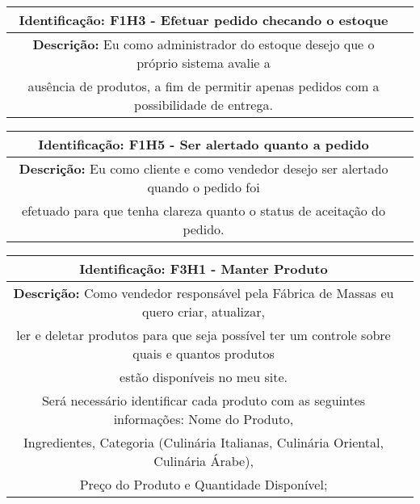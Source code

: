     \begin{table}[H]
    \centering
    \begin{tabular}{c|p{10cm}}
    \hline
    \textbf{Identificação:} F1H3 - Efetuar pedido checando o estoque \\
    \hline
    \textbf{Descrição:} Eu como administrador do estoque desejo que o próprio sistema avalie a \\
    ausência de produtos, a fim de permitir apenas pedidos com a possibilidade de entrega. \\
    \hline
    \end{tabular}
    \end{table}

    \begin{table}[H]
    \centering
    \begin{tabular}{c|p{10cm}}
    \hline
    \textbf{Identificação:} F1H5 - Ser alertado quanto a pedido \\
    \hline
    \textbf{Descrição:} Eu como cliente e como vendedor desejo ser alertado quando o pedido foi \\
    efetuado para que tenha clareza quanto o status de aceitação do pedido.\\
    \hline
    \end{tabular}
\end{table}

\begin{table}[H]
    \centering
    \begin{tabular}{c|p{10cm}}
    \hline
    \textbf{Identificação:} F3H1 - Manter Produto \\
    \hline
    \textbf{Descrição:} Como vendedor responsável pela Fábrica de Massas eu quero criar, atualizar,\\
     ler e deletar produtos para que seja possível ter um controle sobre quais e quantos produtos \\
      estão disponíveis no meu site. \\
    Será necessário identificar cada produto com as seguintes informações: Nome do Produto, \\
    Ingredientes, Categoria (Culinária Italianas, Culinária Oriental, Culinária Árabe), \\
     Preço do Produto e Quantidade Disponível;\\
    \hline
        \end{tabular}
\end{table}

